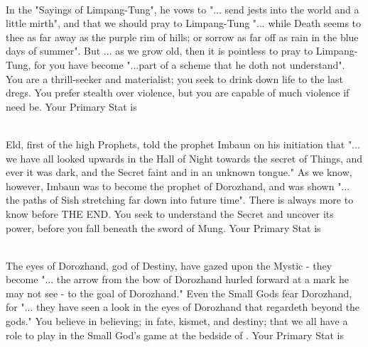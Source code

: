{{      \item {} \\ In the "Sayings of Limpang-Tung", he vows to "... send jests into the world and a little mirth", and that we should pray to Limpang-Tung "... while Death seems to thee as far away as the purple rim of hills; or sorrow as far off as rain in the blue days of summer".   But ... as we grow old, then it is pointless to pray to Limpang-Tung, for you have become "...part of a scheme that he doth not understand".  You are a thrill-seeker and materialist; you seek to drink down life to the last dregs.  You prefer stealth over violence, but you are capable of much violence if need be.  Your Primary Stat is \DEX 

      \item {} \\ Eld, first of the high Prophets, told the prophet Imbaun on his initiation that "... we have all looked upwards in the Hall of Night towards the secret of Things, and ever it was dark, and the Secret faint and in an unknown tongue."  As we know, however, Imbaun was to become the prophet of Dorozhand, and was shown "... the paths of Sish stretching far down into future time".  There is always more to know before THE END. You seek to understand the Secret and uncover its power, before you fall beneath the sword of Mung.  Your Primary Stat is \INT
      
      \item {}   \\ The eyes of Dorozhand, god of Destiny, have gazed upon the Mystic - they become "... the arrow from the bow of Dorozhand hurled forward at a mark he may not see - to the goal of Dorozhand."  Even the Small Gods fear Dorozhand, for "... they have seen a look in the eyes of Dorozhand that regardeth beyond the gods."  You believe in believing; in fate, kismet, and destiny; that we all have a role to play in the Small God's game at the bedside of \TheAuthority. Your Primary Stat is \FOC
    }
  



  \newpage



}
